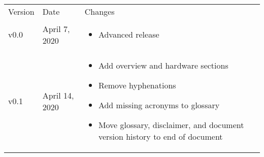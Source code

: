 
\begingroup
    \def\arraystretch{1.5}
    \begin{longtable}{| >{\centering}p{} | p{} | p{} |}
        \arrayrulecolor{gray!50}\hline
        Version & Date & Changes \\
        \arrayrulecolor{gray!50}\hline
        v0.0 & April 7, 2020 &
        \begin{itemize}
            \item Advanced release
        \end{itemize}\\
        v0.1 & April 14, 2020 &
        \begin{itemize}
            \item Add overview and hardware sections
            \item Remove hyphenations
            \item Add missing acronyms to glossary
            \item Move glossary, disclaimer, and document version history to end of document
        \end{itemize}\\

\end{longtable}
